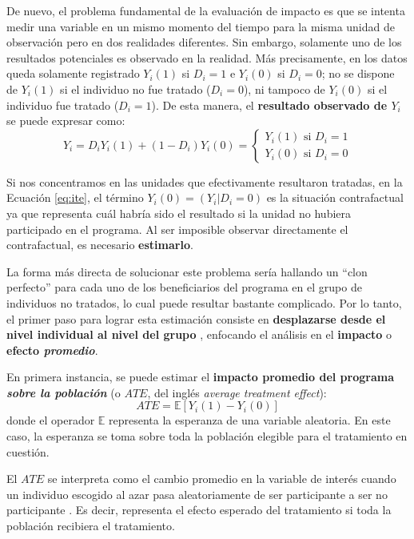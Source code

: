 \documentclass[../../main.tex]{subfiles}
\begin{document}
De nuevo, el problema fundamental de la evaluación de impacto es que se intenta medir una
variable en un mismo momento del tiempo para la misma unidad de observación pero en dos
realidades diferentes. Sin embargo, solamente uno de los resultados potenciales es
observado en la realidad. Más precisamente, en los datos queda solamente registrado
\(Y_i(1)\) si \(D_i=1\) e \(Y_i(0)\) si \(D_i=0\); no se dispone de \(Y_i(1)\) si el
individuo no fue tratado (\(D_i=0\)), ni tampoco de \(Y_i(0)\) si el individuo fue tratado
(\(D_i=1\)). De esta manera, el \textbf{resultado observado de \(Y_i\)} se puede expresar
como:
\begin{equation}
    Y_i = D_i Y_i(1) + (1-D_i)Y_i(0) =
    \begin{cases}
        Y_i(1) \text{ si } D_i=1 \\
        Y_i(0) \text{ si } D_i=0
    \end{cases}
    \label{eq:observed-result}
\end{equation}

Si nos concentramos en las unidades que efectivamente resultaron tratadas, en la Ecuación
\ref{eq:ite}, el término \(Y_i(0) = (Y_i|D_i=0)\) es la situación contrafactual ya que
representa cuál habría sido el resultado si la unidad no hubiera participado en el
programa. Al ser imposible observar directamente el contrafactual, es necesario
\textbf{estimarlo}.

La forma más directa de solucionar este problema sería hallando un ``clon perfecto'' para
cada uno de los beneficiarios del programa en el grupo de individuos no tratados, lo cual
puede resultar bastante complicado. Por lo tanto, el primer paso para lograr esta estimación
consiste en \textbf{desplazarse desde el nivel individual al nivel del grupo}
\cite{gertler-2016}, enfocando el análisis en el \textbf{impacto} o \textbf{efecto
\textit{promedio}}.

En primera instancia, se puede estimar el \textbf{impacto promedio del programa
\textit{sobre la población}} (o \(ATE\), del inglés \textit{average treatment effect}):
\begin{equation}
    ATE = \mathbb{E}\left[Y_i(1)-Y_i(0)\right]
\end{equation}
donde el operador \(\mathbb{E}\) representa la esperanza de una variable aleatoria.
En este caso, la esperanza se toma sobre toda la población elegible para el tratamiento
en cuestión.

El \(ATE\) se interpreta como el cambio promedio en la variable de interés cuando un
individuo escogido al azar pasa aleatoriamente de ser participante a ser no participante
\cite{bernal}. Es decir, representa el efecto esperado del tratamiento si toda la
población recibiera el tratamiento.
\end{document}
